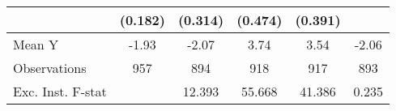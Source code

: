 {\begin{tabular}{l*{5}{c}}
            &     (0.182)         &     (0.314)         &     (0.474)         &     (0.391)         &                     \\
\midrule
Mean Y      &       -1.93         &       -2.07         &        3.74         &        3.54         &       -2.06         \\
Observations&         957         &         894         &         918         &         917         &         893         \\
Exc. Inst. F-stat&                     &      12.393         &      55.668         &      41.386         &       0.235         \\
\bottomrule
\end{tabular}
}
